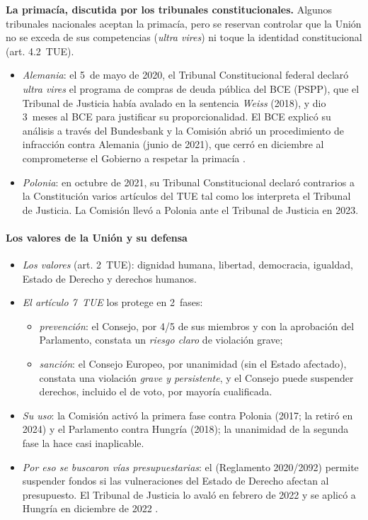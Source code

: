 \documentclass[11pt]{article}
\begin{document}
\begin{anotaciones}
\textbf{La primacía, discutida por los tribunales constitucionales.} Algunos tribunales nacionales aceptan la primacía, pero se reservan controlar que la Unión no se exceda de sus competencias (\emph{ultra vires}) ni toque la identidad constitucional (art. 4.2~TUE).
\begin{itemize}
\item \emph{Alemania}: el 5~de mayo de 2020, el Tribunal Constitucional federal declaró \emph{ultra vires} el programa de compras de deuda pública del BCE (PSPP), que el Tribunal de Justicia había avalado en la sentencia \emph{Weiss} (2018), y dio 3~meses al BCE para justificar su proporcionalidad. El BCE explicó su análisis a través del Bundesbank y la Comisión abrió un procedimiento de infracción contra Alemania (junio de 2021), que cerró en diciembre al comprometerse el Gobierno a respetar la primacía .
\item \emph{Polonia}: en octubre de 2021, su Tribunal Constitucional declaró contrarios a la Constitución varios artículos del TUE tal como los interpreta el Tribunal de Justicia. La Comisión llevó a Polonia ante el Tribunal de Justicia en 2023.
\end{itemize}
\end{anotaciones}

\paragraph{Los valores de la Unión y su defensa}

\begin{itemize}
\item \emph{Los valores} (art. 2~TUE): dignidad humana, libertad, democracia, igualdad, Estado de Derecho y derechos humanos.
\item \emph{El artículo 7~TUE} los protege en 2~fases:
  \begin{itemize}
  \item \emph{prevención}: el Consejo, por 4/5 de sus miembros y con la aprobación del Parlamento, constata un \emph{riesgo claro} de violación grave;
  \item \emph{sanción}: el Consejo Europeo, por unanimidad (sin el Estado afectado), constata una violación \emph{grave y persistente}, y el Consejo puede suspender derechos, incluido el de voto, por mayoría cualificada.
  \end{itemize}
\item \emph{Su uso}: la Comisión activó la primera fase contra Polonia (2017; la retiró en 2024) y el Parlamento contra Hungría (2018); la unanimidad de la segunda fase la hace casi inaplicable.
\item \emph{Por eso se buscaron vías presupuestarias}: el  (Reglamento 2020/2092) permite suspender fondos si las vulneraciones del Estado de Derecho afectan al presupuesto. El Tribunal de Justicia lo avaló en febrero de 2022 y se aplicó a Hungría en diciembre de 2022\nocite{UE2020Condicionalidad} .
\end{itemize}
\end{document}
